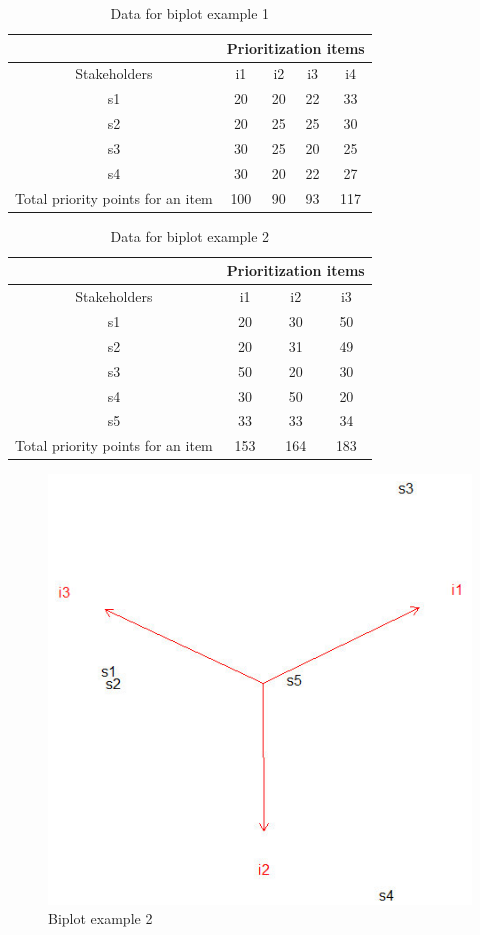 \begin{table}
\caption{\label{tab:Data-for-Biplot}Data for biplot example 1}
\begin{tabular}{|c|c|c|c|c|}
\hline 
 & \multicolumn{4}{c|}{Prioritization items}\tabularnewline
\hline 
Stakeholders & i1 & i2 & i3 & i4\tabularnewline
\hline
\hline 
s1 & 20 & 20 & 22 & 33\tabularnewline
\hline 
s2 & 20 & 25 & 25 & 30\tabularnewline
\hline 
s3 & 30 & 25 & 20 & 25\tabularnewline
\hline 
s4 & 30 & 20 & 22 & 27\tabularnewline
\hline 
Total priority points for an item & 100 & 90 & 93 & 117\tabularnewline
\hline
\end{tabular}
\end{table}

\begin{table}
\caption{\label{tab:Data-for-biplot}Data for biplot example 2}

\begin{tabular}{|c|c|c|c|}
\hline 
 & \multicolumn{3}{c|}{Prioritization items}\tabularnewline
\hline 
Stakeholders & i1 & i2 & i3\tabularnewline
\hline
\hline 
s1 & 20 & 30 & 50\tabularnewline
\hline 
s2 & 20 & 31 & 49\tabularnewline
\hline 
s3 & 50 & 20 & 30\tabularnewline
\hline 
s4 & 30 & 50 & 20\tabularnewline
\hline 
s5 & 33 & 33 & 34\tabularnewline
\hline 
Total priority points for an item & 153 & 164 & 183\tabularnewline
\hline
\end{tabular}
\end{table}

\begin{figure}
\includegraphics[scale=0.5]{fig/biplot3}
\caption{\label{fig:Biplot-example-2}Biplot example 2}
\end{figure}


